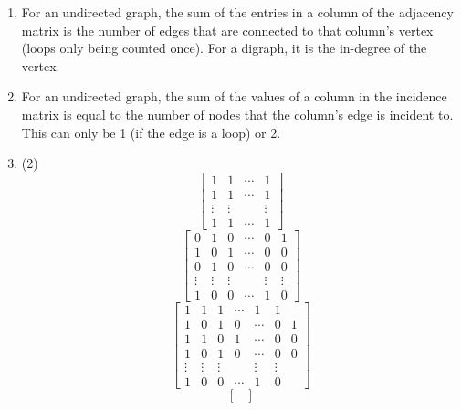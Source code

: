 \documentclass[12pt, A4]{article}
\newcommand{\enumset}[1]{\setcounter{enumi}{#1}}
\begin{document}
\begin{enumerate}
\[{								a & 1 & 1  & 1 & 1 & 0 & 0 & 0 & 0 & 0 & 0 \\
								b & 0 & 0 & 0 & 0 & 1 & 1 & 1 & 1 & 0 & 0 \\
								c & 0 & 1 & 1 & 0 & 0 & 1 & 0 & 0 & 1 & 0 \\
								d & 0 & 0 & 0 & 1 & 0 & 0 & 1 & 1 & 0 & 1
							}
					\] 
				\enumset{32}
				\item
					For an undirected graph, the sum of the entries in a column of the adjacency matrix is the number of edges that are connected to that column's vertex (loops only being counted once). For a digraph, it is the in-degree of the vertex.
				\enumset{34}
				\item
					For an undirected graph, the sum of the values of a column in the incidence matrix is equal to the number of nodes that the column's edge is incident to. This can only be 1 (if the edge is a loop) or 2.
				\item
					\begin{tasks}(2)
						\task
							\[\begin{bmatrix}
								1 & 1 & \cdots & 1 \\
								1 & 1 & \cdots & 1 \\
								\vdots & \vdots & & \vdots \\
								1 & 1 & \cdots & 1
							\end{bmatrix}\]
						\task
							\[\begin{bmatrix}
								0 & 1 & 0 & \cdots & 0 & 1 \\
								1 & 0 & 1 & \cdots & 0 & 0 \\
								0 & 1 & 0 & \cdots & 0 & 0 \\
								\vdots & \vdots & \vdots & & \vdots & \vdots \\
								1 & 0 & 0 & \cdots & 1 & 0
							\end{bmatrix}\]
						\task
							\[\begin{bmatrix}
								1 & 1 & 1 & \cdots & 1 & 1 \\
								1 & 0 & 1 & 0 & \cdots & 0 & 1 \\
								1 & 1 & 0 & 1 & \cdots & 0 & 0 \\
								1 & 0 & 1 & 0 & \cdots & 0 & 0 \\
								\vdots & \vdots & \vdots & & \vdots & \vdots \\
								1 & 0 & 0 & \cdots & 1 & 0
							\end{bmatrix}\]
						\task
							\[\begin{bmatrix}

\end{bmatrix}\]
\end{tasks}
\end{enumerate}
\end{document}
